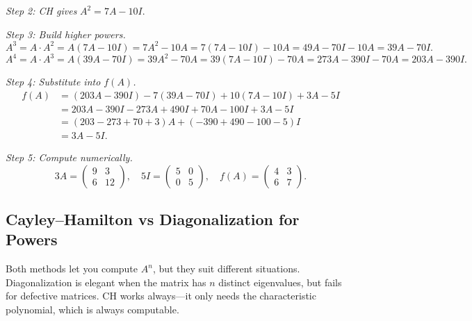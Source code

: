 \documentclass[12pt,a4paper]{article}
\begin{document}
\textit{Step 2: CH gives} \(A^2 = 7A - 10I\).

\textit{Step 3: Build higher powers.}
\[
  A^3 = A \cdot A^2 = A(7A - 10I) = 7A^2 - 10A = 7(7A-10I) - 10A = 49A - 70I - 10A = 39A - 70I.
\]
\[
  A^4 = A \cdot A^3 = A(39A - 70I) = 39A^2 - 70A = 39(7A-10I) - 70A = 273A - 390I - 70A = 203A - 390I.
\]

\textit{Step 4: Substitute into \(f(A)\).}
\begin{align*}
  f(A) &= (203A - 390I) - 7(39A - 70I) + 10(7A - 10I) + 3A - 5I \\
       &= 203A - 390I - 273A + 490I + 70A - 100I + 3A - 5I \\
       &= (203 - 273 + 70 + 3)A + (-390 + 490 - 100 - 5)I \\
       &= 3A - 5I.
\end{align*}

\textit{Step 5: Compute numerically.}
\[
  3A = \begin{pmatrix}9&3\\6&12\end{pmatrix}, \quad 5I = \begin{pmatrix}5&0\\0&5\end{pmatrix},
  \quad f(A) = \begin{pmatrix}4&3\\6&7\end{pmatrix}.
\]

\subsection{Cayley--Hamilton vs Diagonalization for Powers}

Both methods let you compute \(A^n\), but they suit different situations. Diagonalization is elegant when the matrix has \(n\) distinct eigenvalues, but fails for defective matrices. CH works always---it only needs the characteristic polynomial, which is always computable.
\end{document}
